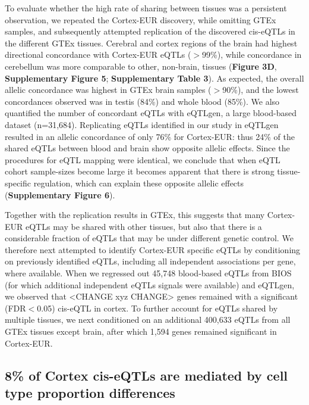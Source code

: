 {{To evaluate whether the high rate of sharing between tissues was a persistent observation, we repeated the Cortex-EUR discovery, while omitting GTEx samples, and subsequently attempted replication of the discovered cis-eQTLs in the different GTEx tissues\cite{consortiumGTExConsortiumAtlas2020}. Cerebral and cortex regions of the brain had highest directional concordance with Cortex-EUR eQTLs ($>$99\%), while concordance in cerebellum was more comparable to other, non-brain, tissues (\textbf{Figure 3D}, \textbf{Supplementary Figure 5}; \textbf{Supplementary Table 3}). As expected, the overall allelic concordance was highest in GTEx brain samples ($>$90\%), and the lowest concordances observed was in testis (84\%) and whole blood (85\%). We also quantified the number of concordant eQTLs with eQTLgen, a large blood-based dataset (n=31,684). Replicating eQTLs identified in our study in eQTLgen resulted in an allelic concordance of only 76\% for Cortex-EUR: thus 24\% of the shared eQTLs between blood and brain show opposite allelic effects. Since the procedures for eQTL mapping were identical, we conclude that when eQTL cohort sample-sizes become large it becomes apparent that there is strong tissue-specific regulation, which can explain these opposite allelic effects\cite{fuUnravelingRegulatoryMechanisms2012} (\textbf{Supplementary Figure 6}). 

Together with the replication results in GTEx, this suggests that many Cortex-EUR eQTLs may be shared with other tissues, but also that there is a considerable fraction of eQTLs that may be under different genetic control. We therefore next attempted to identify Cortex-EUR specific eQTLs by conditioning on previously identified eQTLs, including all independent associations per gene, where available. When we regressed out 45,748 blood-based eQTLs from BIOS\cite{zhernakovaIdentificationContextdependentExpression2017} (for which additional independent eQTLs signals were available) and eQTLgen, we observed that <CHANGE xyz CHANGE> genes remained with a significant (FDR$<$0.05) cis-eQTL in cortex. To further account for eQTLs shared by multiple tissues, we next conditioned on an additional 400,633 eQTLs from all GTEx tissues except brain, after which 1,594 genes remained significant in Cortex-EUR.

\subsection{8\% of Cortex cis-eQTLs are mediated by cell type proportion differences}
	
}}
